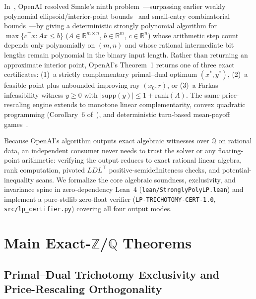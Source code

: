 \documentclass[11pt,a4paper]{article}
\theoremstyle{definition}
\theoremstyle{remark}
\newcommand{\QQ}{\mathbb{Q}}
\newcommand{\RR}{\mathbb{R}}
\newcommand{\ZZ}{\mathbb{Z}}
\newcommand{\certschema}{\texttt{LP-TRICHOTOMY-CERT-1.0}}
\begin{document}
In~\cite{openai2026lp}, OpenAI resolved Smale's ninth problem~\cite{smale1998mathematical}---surpassing earlier weakly polynomial ellipsoid/interior-point bounds~\cite{khachiyan1979polynomial} and small-entry combinatorial bounds~\cite{tardos1986strongly}---by giving a deterministic strongly polynomial algorithm for $\max \{c^\top x : Ax \le b\}$ ($A \in \RR^{m\times n}$, $b \in \RR^m$, $c \in \RR^n$) whose arithmetic step count depends only polynomially on $(m,n)$ and whose rational intermediate bit lengths remain polynomial in the binary input length. Rather than returning an approximate interior point, OpenAI's Theorem~1 returns one of three exact certificates: (1)~a strictly complementary primal--dual optimum $(x^*, y^*)$, (2)~a feasible point plus unbounded improving ray $(x_0, r)$, or (3)~a Farkas infeasibility witness $y \ge 0$ with $|\mathrm{supp}(y)| \le 1 + \mathrm{rank}(A)$. The same price-rescaling engine extends to monotone linear complementarity, convex quadratic programming (Corollary~6 of~\cite{openai2026lp}), and deterministic turn-based mean-payoff games~\cite{ehrenfeucht1979positional,zwick1996complexity}.

Because OpenAI's algorithm outputs exact algebraic witnesses over $\QQ$ on rational data, an independent consumer never needs to trust the solver or any floating-point arithmetic: verifying the output reduces to exact rational linear algebra, rank computation, pivoted $LDL^\top$ positive-semidefiniteness checks, and potential-inequality scans. We formalize the core algebraic soundness, exclusivity, and invariance spine in zero-dependency Lean~4 (\texttt{lean/StronglyPolyLP.lean}) and implement a pure-stdlib zero-float verifier (\certschema{}, \texttt{src/lp\_certifier.py}) covering all four output modes.

\section{Main Exact-\texorpdfstring{$\ZZ$}{Z}/\texorpdfstring{$\QQ$}{Q} Theorems}\label{sec:results}

\subsection{Primal--Dual Trichotomy Exclusivity and Price-Rescaling Orthogonality}
\end{document}
